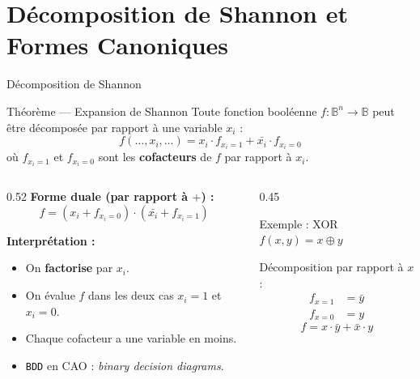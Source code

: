 \section{Décomposition de Shannon et Formes Canoniques}
\begin{frame}{Décomposition de Shannon}

    \begin{block}{Théorème — Expansion de Shannon }
        Toute fonction booléenne \(f : \mathbb{B}^n \to \mathbb{B}\) peut être décomposée par rapport à une variable \(x_i\) :
        \[
            f(\dots, x_i, \dots) = x_i \cdot f_{x_i=1} + \bar{x_i} \cdot f_{x_i=0}
        \]
        où \(f_{x_i=1}\) et \(f_{x_i=0}\) sont les \textbf{cofacteurs} de \(f\) par rapport à \(x_i\).
    \end{block}

    \vspace{0.1cm}

    \begin{columns}[T]
        \begin{column}{0.52\textwidth}
            \textbf{Forme duale (par rapport à \(+\)) :}
            \[
                f = (x_i + f_{x_i=0}) \cdot (\bar{x_i} + f_{x_i=1})
            \]

            \vspace{0.1cm}

            \textbf{Interprétation :}
            \begin{itemize}
                \item On \textbf{factorise} par \(x_i\).
                \item On évalue \(f\) dans les deux cas \(x_i = 1\) et \(x_i = 0\).
                \item Chaque cofacteur a une variable en moins.
                \item \texttt{BDD} en CAO : \textit{binary decision diagrams}.
            \end{itemize}
        \end{column}

        \begin{column}{0.45\textwidth}
            \begin{exampleblock}{Exemple : XOR}
                \(f(x,y) = x \oplus y \)

                \vspace{0.1cm}

                Décomposition par rapport à \(x\) :
                \begin{align*}
                    f_{x=1} &= \bar{y} \\
                    f_{x=0} &= y
                \end{align*}
                \[
                    f = x \cdot \bar{y} + \bar{x} \cdot y
                \]
            \end{exampleblock}
        \end{column}
    \end{columns}


\end{frame}

